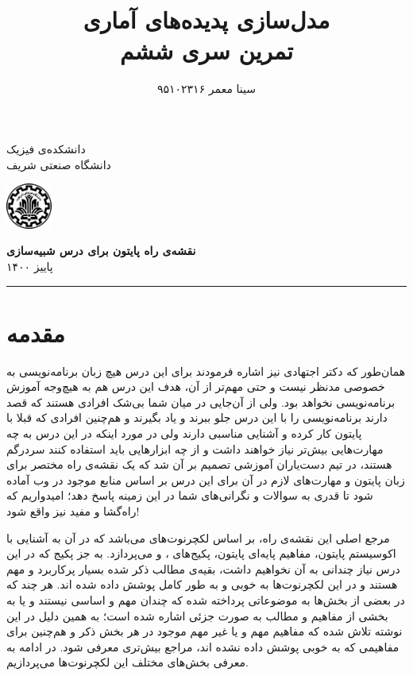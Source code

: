 \documentclass[11pt, a4paper]{article}
\title{\textbf{مدل‌سازی پدیده‌های آماری}\\تمرین سری ششم}
\author{سینا معمر ۹۵۱۰۲۳۱۶}
\begin{document}
\pagestyle{plain}
\begin{flushright}
  دانشکده‌ی فیزیک\\
  دانشگاه صنعتی شریف
\end{flushright}

\begin{flushleft}\vspace{-1.8cm}
  \includegraphics[height=1.5cm]{sharif_logo.png}
\end{flushleft}
 
\begin{center}\vspace{0cm}
  \textbf{\large نقشه‌ی راه پایتون برای درس شبیه‌سازی}\\
  \vspace{3mm}
  پاییز ۱۴۰۰\\
\end{center}
\rule{\linewidth}{0.1mm}


\section{مقدمه}
همان‌طور که دکتر اجتهادی نیز اشاره فرمودند
برای این درس هیچ زبان‌ برنامه‌نویسی به خصوصی مدنظر نیست و حتی مهم‌تر از آن،
هدف این درس هم به هیچ‌وجه آموزش برنامه‌نویسی نخواهد بود.
ولی از آن‌جایی در میان شما بی‌شک افرادی هستند که قصد دارند برنامه‌نویسی را با این درس جلو ببرند و یاد بگیرند
و هم‌چنین افرادی که قبلا با پایتون کار کرده و آشنایی مناسبی دارند ولی در مورد اینکه در این درس به چه مهارت‌هایی بیش‌تر نیاز خواهند داشت
و از چه ابزارهایی باید استفاده کنند سردرگم هستند،
در تیم دست‌یاران آموزشی تصمیم بر آن شد که یک نقشه‌ی راه مختصر برای زبان پایتون و مهارت‌های لازم در آن برای این درس بر اساس
منابع موجود در وب آماده شود تا قدری به سوالات و نگرانی‌های شما در این زمینه پاسخ دهد؛
امیدواریم که راه‌گشا و مفید نیز واقع شود!

مرجع اصلی این نقشه‌ی راه،
بر اساس لکچرنوت‌های
\href{https://scipy-lectures.org/intro/}{}
می‌باشد که در آن به آشنایی با اکوسیستم پایتون، مفاهیم پایه‌ای پایتون، پکیج‌های
،
و
می‌پردازد.
به جز پکیج
که در این درس نیاز چندانی به آن نخواهیم داشت،
بقیه‌ی مطالب ذکر شده بسیار پرکاربرد و مهم هستند و در این لکچرنوت‌ها به خوبی و به طور کامل پوشش داده شده اند.
هر چند که در بعضی از بخش‌ها به موضوعاتی پرداخته شده که چندان مهم و اساسی نیستند و یا به بخشی از مفاهیم و مطالب
به صورت جزئی اشاره شده است؛
به همین دلیل در این نوشته تلاش شده که مفاهیم مهم و یا غیر مهم موجود در هر بخش ذکر
و هم‌چنین برای مفاهیمی که به خوبی پوشش داده نشده اند،
مراجع بیش‌تری معرفی شود.
در ادامه به معرفی بخش‌های مختلف این لکچرنوت‌ها می‌پردازیم.
\end{document}
